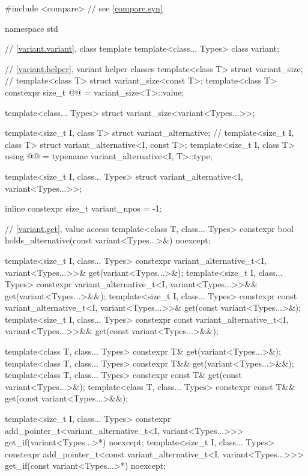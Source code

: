 \begin{codeblock}
#include <compare>              // see \ref{compare.syn}

namespace std {
  // \ref{variant.variant}, class template 
  template<class... Types>
    class variant;

  // \ref{variant.helper}, variant helper classes
  template<class T> struct variant_size;                        // \notdef
  template<class T> struct variant_size<const T>;
  template<class T>
    constexpr size_t @@ = variant_size<T>::value;

  template<class... Types>
    struct variant_size<variant<Types...>>;

  template<size_t I, class T> struct variant_alternative;       // \notdef
  template<size_t I, class T> struct variant_alternative<I, const T>;
  template<size_t I, class T>
    using @@ = typename variant_alternative<I, T>::type;

  template<size_t I, class... Types>
    struct variant_alternative<I, variant<Types...>>;

  inline constexpr size_t variant_npos = -1;

  // \ref{variant.get}, value access
  template<class T, class... Types>
    constexpr bool holds_alternative(const variant<Types...>&) noexcept;

  template<size_t I, class... Types>
    constexpr variant_alternative_t<I, variant<Types...>>& get(variant<Types...>&);
  template<size_t I, class... Types>
    constexpr variant_alternative_t<I, variant<Types...>>&& get(variant<Types...>&&);
  template<size_t I, class... Types>
    constexpr const variant_alternative_t<I, variant<Types...>>& get(const variant<Types...>&);
  template<size_t I, class... Types>
    constexpr const variant_alternative_t<I, variant<Types...>>&& get(const variant<Types...>&&);

  template<class T, class... Types>
    constexpr T& get(variant<Types...>&);
  template<class T, class... Types>
    constexpr T&& get(variant<Types...>&&);
  template<class T, class... Types>
    constexpr const T& get(const variant<Types...>&);
  template<class T, class... Types>
    constexpr const T&& get(const variant<Types...>&&);

  template<size_t I, class... Types>
    constexpr add_pointer_t<variant_alternative_t<I, variant<Types...>>>
      get_if(variant<Types...>*) noexcept;
  template<size_t I, class... Types>
    constexpr add_pointer_t<const variant_alternative_t<I, variant<Types...>>>
      get_if(const variant<Types...>*) noexcept;

}
\end{codeblock}
